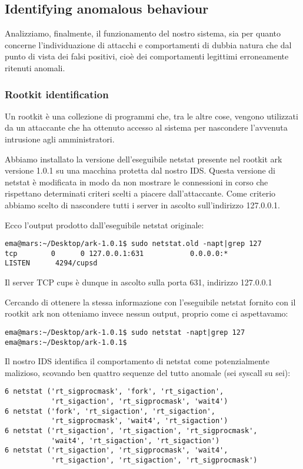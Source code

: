 \documentclass[11pt]{article}
\begin{document}
\subsection{Identifying anomalous behaviour}
Analizziamo, finalmente, il funzionamento del nostro sistema, sia per quanto
concerne l'individuazione di attacchi e comportamenti di dubbia natura che dal
punto di vista dei falsi positivi, cioè dei comportamenti legittimi
erroneamente ritenuti anomali.

\subsubsection{Rootkit identification}
Un rootkit è una collezione di programmi che, tra le altre cose, vengono
utilizzati da un attaccante che ha ottenuto accesso al sistema per nascondere
l'avvenuta intrusione agli amministratori.

Abbiamo installato la versione dell'eseguibile netstat presente nel rootkit ark
versione 1.0.1 su una macchina protetta dal nostro IDS. Questa versione di
netstat è modificata in modo da non mostrare le connessioni in corso che
rispettano determinati criteri scelti a piacere dall'attaccante. Come criterio
abbiamo scelto di nascondere tutti i server in ascolto sull'indirizzo
127.0.0.1.

Ecco l'output prodotto dall'eseguibile netstat originale:

\begin{lstlisting}
ema@mars:~/Desktop/ark-1.0.1$ sudo netstat.old -napt|grep 127
tcp        0      0 127.0.0.1:631           0.0.0.0:*               LISTEN      4294/cupsd      
\end{lstlisting}

Il server TCP cups è dunque in ascolto sulla porta 631, indirizzo 127.0.0.1

Cercando di ottenere la stessa informazione con l'eseguibile netstat fornito
con il rootkit ark non otteniamo invece nessun output, proprio come ci
aspettavamo:

\begin{lstlisting}
ema@mars:~/Desktop/ark-1.0.1$ sudo netstat -napt|grep 127
ema@mars:~/Desktop/ark-1.0.1$ 
\end{lstlisting}

Il nostro IDS identifica il comportamento di netstat come potenzialmente
malizioso, scovando ben quattro sequenze del tutto anomale (sei syscall su
sei):

\begin{lstlisting}
6 netstat ('rt_sigprocmask', 'fork', 'rt_sigaction', 
           'rt_sigaction', 'rt_sigprocmask', 'wait4')
6 netstat ('fork', 'rt_sigaction', 'rt_sigaction', 
           'rt_sigprocmask', 'wait4', 'rt_sigaction')
6 netstat ('rt_sigaction', 'rt_sigaction', 'rt_sigprocmask', 
           'wait4', 'rt_sigaction', 'rt_sigaction')
6 netstat ('rt_sigaction', 'rt_sigprocmask', 'wait4', 
           'rt_sigaction', 'rt_sigaction', 'rt_sigprocmask')
\end{lstlisting}
\end{document}
